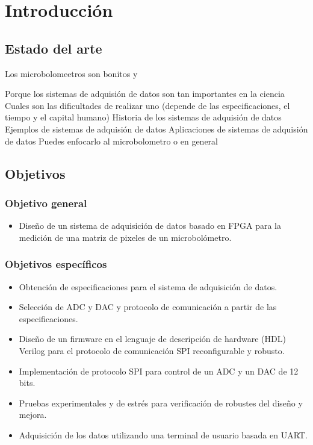 \chapter{Introducción}

	\section{Estado del arte}
	
	Los microbolomeetros son bonitos y \cite{Hernandez2021}
	
	Porque los sistemas de adquisión de datos son tan importantes en la ciencia
	Cuales son las dificultades de realizar uno (depende de las especificaciones, el tiempo y el capital humano)
	Historia de los sistemas de adquisión de datos
	Ejemplos de sistemas de adquisión de datos
	Aplicaciones de sistemas de adquisión de datos
	Puedes enfocarlo al microbolometro o en general
	


    \section{Objetivos}
	
		\subsection{Objetivo general}
			\begin{itemize}
				\item Diseño de un sistema de adquisición de datos basado en FPGA para la medición de una matriz de pixeles de un microbolómetro.
			\end{itemize}
		
		\subsection{Objetivos específicos}
			\begin{itemize}
                \item Obtención de especificaciones para el sistema de adquisición de datos.
                \item Selección de ADC y DAC y protocolo de comunicación a partir de las especificaciones.
                \item Diseño de un firmware en el lenguaje de descripción de hardware (HDL) Verilog para el protocolo de comunicación SPI reconfigurable y robusto.
                \item Implementación de protocolo SPI para control de un ADC y un DAC de 12 bits.
                \item Pruebas experimentales y de estrés para verificación de robustes del diseño y mejora.
                \item Adquisición de los datos utilizando una terminal de usuario basada en UART.
			\end{itemize}
